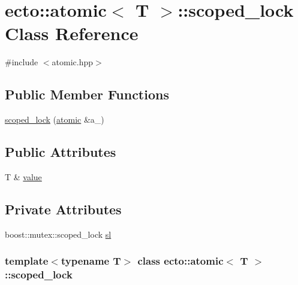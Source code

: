 \hypertarget{classecto_1_1atomic_1_1scoped__lock}{\section{ecto\-:\-:atomic$<$ \-T $>$\-:\-:scoped\-\_\-lock \-Class \-Reference}
\label{classecto_1_1atomic_1_1scoped__lock}
}


{\ttfamily \#include $<$atomic.\-hpp$>$}

\subsection*{\-Public \-Member \-Functions}
\begin{DoxyCompactItemize}
\item 
\hyperlink{classecto_1_1atomic_1_1scoped__lock_aa5a512f623ed5bd0f4010e200ad86e14}{scoped\-\_\-lock} (\hyperlink{classecto_1_1atomic}{atomic} \&a\-\_\-)
\end{DoxyCompactItemize}
\subsection*{\-Public \-Attributes}
\begin{DoxyCompactItemize}
\item 
\-T \& \hyperlink{classecto_1_1atomic_1_1scoped__lock_a89aa811b27815c91f99b3673a7f76753}{value}
\end{DoxyCompactItemize}
\subsection*{\-Private \-Attributes}
\begin{DoxyCompactItemize}
\item 
boost\-::mutex\-::scoped\-\_\-lock \hyperlink{classecto_1_1atomic_1_1scoped__lock_a637b9c7c8246e2ac352cb03fa9f4b229}{sl}
\end{DoxyCompactItemize}
\subsubsection*{template$<$typename T$>$ class ecto\-::atomic$<$ T $>$\-::scoped\-\_\-lock}



